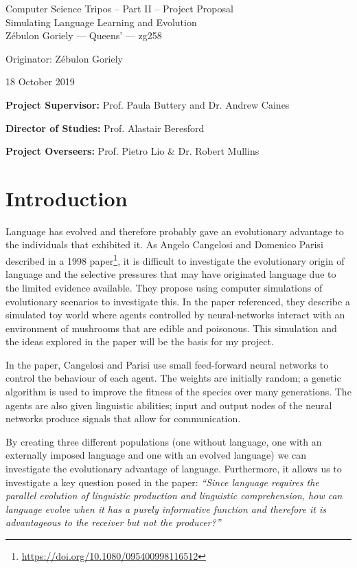 \documentclass[12pt,a4paper,twoside]{article}
\begin{document}
\newcommand{\sups}{\textsuperscript}

\begin{center}
\Large
Computer Science Tripos -- Part II -- Project Proposal\\[4mm]
\LARGE
Simulating Language Learning and Evolution\\[4mm]

\large
Z\'ebulon Goriely --- Queens' --- zg258

Originator: Z\'ebulon Goriely

18 October 2019
\end{center}

\vspace{5mm}

\textbf{Project Supervisor:} Prof. Paula Buttery and Dr. Andrew Caines

\textbf{Director of Studies:} Prof. Alastair Beresford

\textbf{Project Overseers:} Prof. Pietro Lio  \& Dr. Robert Mullins


\section*{Introduction}


Language has evolved and therefore probably gave an evolutionary advantage to the individuals that exhibited it. As Angelo Cangelosi and Domenico Parisi described in a 1998 paper\footnote{\url{https://doi.org/10.1080/095400998116512}}, it is difficult to investigate the evolutionary origin of language and the selective pressures that may have originated language due to the limited evidence available. They propose using computer simulations of evolutionary scenarios to investigate this. In the paper referenced, they describe a simulated toy world where agents controlled by neural-networks interact with an environment of mushrooms that are edible and poisonous. This simulation and the ideas explored in the paper will be the basis for my project.

In the paper, Cangelosi and Parisi use small feed-forward neural networks to control the behaviour of each agent. The weights are initially random; a genetic algorithm is used to improve the fitness of the species over many generations. The agents are also given linguistic abilities; input and output nodes of the neural networks produce signals that allow for communication.

By creating three different populations (one without language, one with an externally imposed language and one with an evolved language) we can investigate the evolutionary advantage of language. Furthermore, it allows us to investigate a key question posed in the paper: \emph{``Since language requires the parallel evolution of linguistic production and linguistic comprehension, how can language evolve when it has a purely informative function and therefore it is advantageous to the receiver but not the producer?''}
\end{document}

